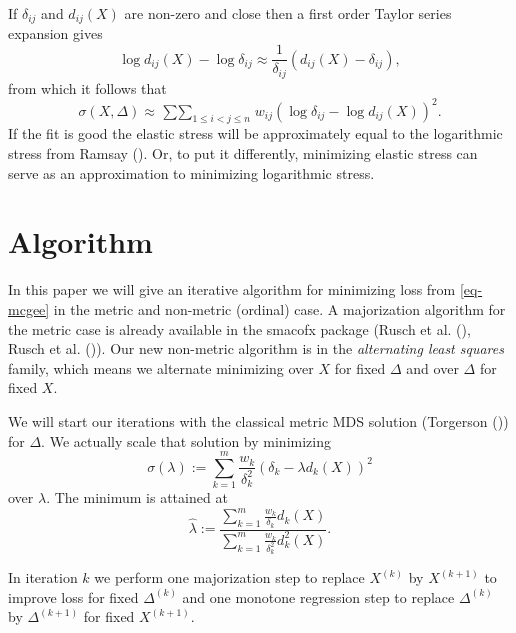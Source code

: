 \documentclass[
  12pt,
  letterpaper,
  DIV=11,
  numbers=noendperiod]{scrartcl}
\begin{document}
If \(\delta_{ij}\) and \(d_{ij}(X)\) are non-zero and close then a first
order Taylor series expansion gives \begin{equation}
  \log d_{ij}(X) - \log\delta_{ij} \approx \frac{1}{\delta_{ij}}(d_{ij}(X) - \delta_{ij}),\label{eq-ddelta}
\end{equation} from which it follows that \begin{equation}
  \sigma(X,\Delta) \approx \mathop{\sum\sum}_{1 \leq i<j \leq n}w_{ij}(\log\delta_{ij} - \log d_{ij}(X))^2.\label{eq-approx}
\end{equation} If the fit is good the elastic stress will be
approximately equal to the logarithmic stress from Ramsay
(). Or, to put it differently, minimizing
elastic stress can serve as an approximation to minimizing logarithmic
stress.

\section{Algorithm}\label{algorithm}

In this paper we will give an iterative algorithm for minimizing loss
from \eqref{eq-mcgee} in the metric and non-metric (ordinal) case. A
majorization algorithm for the metric case is already available in the
smacofx package ({Rusch et al.}
(), {Rusch et al.}
()). Our new non-metric
algorithm is in the \emph{alternating least squares} family, which means
we alternate minimizing over \(X\) for fixed \(\Delta\) and over
\(\Delta\) for fixed \(X\).

We will start our iterations with the classical metric MDS solution
(Torgerson ()) for \(\Delta\). We
actually scale that solution by minimizing \begin{equation}
  \sigma(\lambda) := \sum_{k=1}^m \frac{w_k}{\delta_k^2}(\delta_k - \lambda d_k(X))^2\label{eq-lstress}
\end{equation} over \(\lambda\). The minimum is attained at
\begin{equation}
  \hat\lambda := \frac{\sum_{k=1}^m \frac{w_k}{\delta_k}d_k(X)}{\sum_{k=1}^m \frac{w_k}{\delta_k^2}d_k^2(X)}.\label{eq-lbd}
\end{equation}

In iteration \(k\) we perform one majorization step to replace
\(X^{(k)}\) by \(X^{(k+1)}\) to improve loss for fixed \(\Delta^{(k)}\)
and one monotone regression step to replace \(\Delta^{(k)}\) by
\(\Delta^{(k+1)}\) for fixed \(X^{(k+1)}\).
\end{document}
